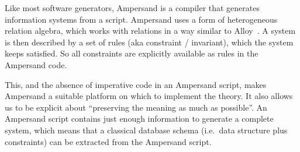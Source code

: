 \documentclass[runningheads]{llncs}
\begin{document}
   Like most software generators, Ampersand is a compiler that generates information systems from a script.
   Ampersand uses a form of heterogeneous relation algebra,
   which works with relations in a way similar to Alloy~\cite{Alloy2006}.
   A system is then described by a set of rules (aka constraint / invariant), which the system keeps satisfied.
   So all constraints are explicitly available as rules in the Ampersand code.

   This, and the absence of imperative code in an Ampersand script, makes Ampersand a suitable platform on which to implement the theory.
   It also allows us to be explicit about ``preserving the meaning as much as possible''.
   An Ampersand script contains just enough information to generate a complete system,
   which means that a classical database schema (i.e.\ data structure plus constraints) can be extracted from the Ampersand script.
\end{document}
